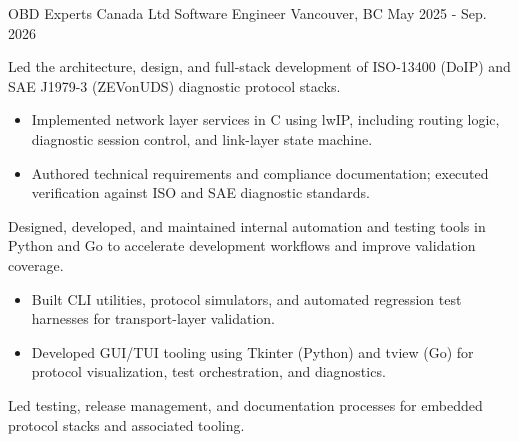 

\vspace{-1ex}
\begin{cventries}
    \cventry
    {OBD Experts Canada Ltd} %
    {Software Engineer} %
    {Vancouver, BC} %
    {May 2025 - Sep. 2026} %
    {
        \begin{cvitems}
        \item {Led the architecture, design, and full-stack development of ISO-13400 (DoIP) and SAE J1979-3 (ZEVonUDS) diagnostic protocol stacks.}
        \begin{itemize}
            \item {Implemented network layer services in C using lwIP, including routing logic, diagnostic session control, and link-layer state machine.}
            \item {Authored technical requirements and compliance documentation; executed verification against ISO and SAE diagnostic standards.}
        \end{itemize}
        \item {Designed, developed, and maintained internal automation and testing tools in Python and Go to accelerate development workflows and improve validation coverage.}
        \begin{itemize}
            \item {Built CLI utilities, protocol simulators, and automated regression test harnesses for transport-layer validation.}
            \item {Developed GUI/TUI tooling using Tkinter (Python) and tview (Go) for protocol visualization, test orchestration, and diagnostics.}
        \end{itemize}
        \item {Led testing, release management, and documentation processes for embedded protocol stacks and associated tooling.}
        \end{cvitems}
        \vspace{3mm}
    \vspace{1mm}
    }


\end{cventries}
